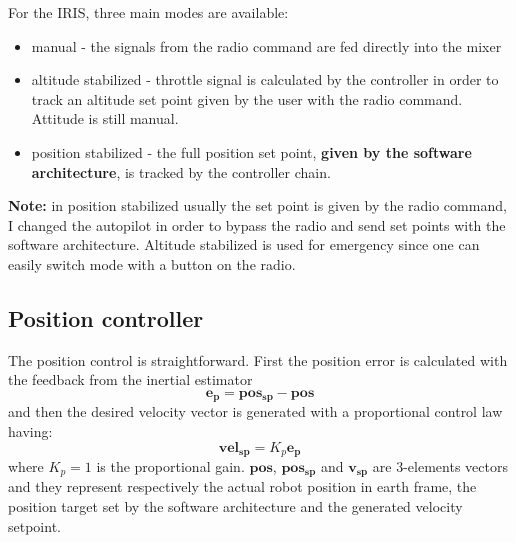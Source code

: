 \noindent
For the IRIS, three main modes are available: \begin{itemize}
	\item manual - the signals from the radio command are fed directly into the mixer
	\item altitude stabilized - throttle signal is calculated by the controller in order to track an altitude set point given by the user with the radio command. Attitude is still manual.
	\item position stabilized - the full position set point, \textbf{given by the software architecture}, is tracked by the controller chain.
\end{itemize}
\noindent
\textbf{Note:} in position stabilized usually the  set point is given by the radio command, I changed the autopilot in order to bypass the radio and send set points with the software architecture. Altitude stabilized is used for emergency since one can easily switch mode with a button on the radio.


\subsection{Position controller}
The position control is straightforward. First the position error is calculated with the feedback from the inertial estimator \begin{equation}
	\boldsymbol{e_p} =\boldsymbol{pos_{sp}} - \boldsymbol{pos}
\end{equation}
and then the desired velocity vector is generated with a proportional control law having:
\begin{equation}
	\boldsymbol{vel_{sp}} = K_p \boldsymbol{e_p}
\end{equation}
where $K_p = 1$ is the proportional gain. $\boldsymbol{pos}$, $\boldsymbol{pos_{sp}}$ and $\boldsymbol{v_{sp}}$ are 3-elements vectors and they represent respectively the actual robot position in earth frame, the position target set by the software architecture and the generated velocity setpoint.

